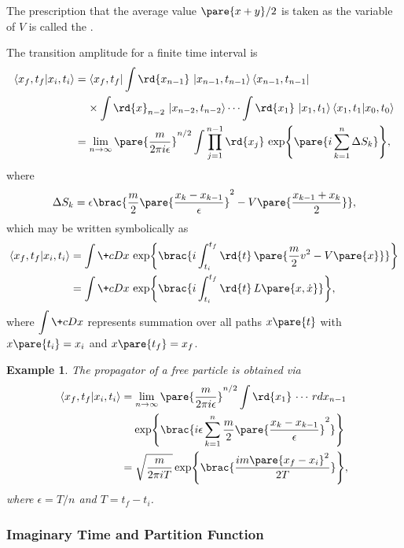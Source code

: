 \documentclass[hidelinks]{article}
\newtheorem{example}{Example}
\begin{document}
The prescription that the average value $\pare{x+y}/2$ is taken as the variable of $V$ is called the .
\par
The transition amplitude for a finite time interval is
\begin{align*}
    \bra{x_f,t_f}\ket{x_i,t_i} &= \bra{x_f,t_f} \int \rd{x_{n-1}}\,\ket{x_{n-1},t_{n-1}}\bra{x_{n-1},t_{n-1}} \\
    &\phantom{=\ }\times \int \rd{x}_{n-2}\,\ket{x_{n-2},t_{n-2}}\cdots \int \rd{x_1}\,\ket{x_1,t_1}\bra{x_1,t_1}\ket{x_0,t_0} \\
    &= \lim_{n\rightarrow \infty}\pare{\frac{m}{2\pi i\epsilon}}^{n/2} \int \prod_{j=1}^{n-1}\rd{x_j}\, \exp\pare{i\sum_{k=1}^n \Delta S_k},
\end{align*}
where
\[ \Delta S_k = \epsilon\brac{\frac{m}{2}\pare{\frac{x_k-x_{k-1}}{\epsilon}}^2 - V\pare{\frac{x_{k-1}+x_k}{2}}}, \]
which may be written symbolically as
\begin{align*}
    \bra{x_f,t_f}\ket{x_i,t_i} &= \int \+cDx\,\exp\brac{i\int_{t_i}^{t_f}\rd{t}\,\pare{\frac{m}{2}v^2 - V\pare{x}}} \\
    &= \int \+cDx\,\exp\brac{i\int_{t_i}^{t_f}\rd{t}\,L\pare{x,\dot{x}}},
\end{align*}
where $\displaystyle \int \+cDx$ represents summation over all paths $x\pare{t}$ with $x\pare{t_i} = x_i$ and $x\pare{t_f} = x_f$.
\begin{sample}
    \begin{example}
        The propagator of a free particle is obtained via
        \begin{align*}
            \bra{x_f,t_f}\ket{x_i,t_i} &= \lim_{n\rightarrow \infty}\pare{\frac{m}{2\pi i\epsilon}}^{n/2}\int \rd{x_1}\,\cdots\,rd{x_{n-1}} \\
            &\phantom{=}\ \exp\brac{i\epsilon \sum_{k=1}^n \frac{m}{2}\pare{\frac{x_k - x_{k-1}}{\epsilon}}^2} \\
            &= \sqrt{\frac{m}{2\pi iT}}\exp\brac{\frac{im\pare{x_f - x_i}^2}{2T}},
        \end{align*}
        where $\epsilon = T/n$ and $T = t_f - t_i$.
    \end{example}
\end{sample}


\subsubsection{Imaginary Time and Partition Function} %
\label{ssub:imaginary_time_and_partition_function}
\end{document}
